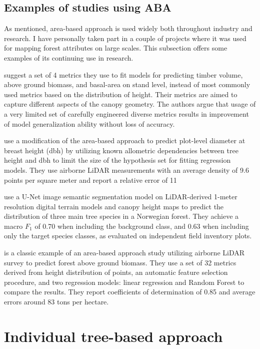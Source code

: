 \subsection{Examples of studies using ABA}

As mentioned, area-based approach is used widely both throughout industry and research.
I have personally taken part in a couple of projects where it was used for mapping forest attributes on large scales.
This subsection offers some examples of its continuing use in research.

\citet{bouvierGeneralizingPredictiveModels2015} suggest a set of 4 metrics they use to fit models for predicting timber volume, above ground biomass, and basal-area on stand level, instead of most commonly used metrics based on the distribution of height.
Their metrics are aimed to capture different aspects of the canopy geometry.
The authors argue that usage of a very limited set of carefully engineered diverse metrics results in improvement of model generalization ability without loss of accuracy.

\citet{zhangImprovedAreabasedApproach2023} use a modification of the area-based approach to predict plot-level diameter at breast height (dbh) by utilizing known allometric dependencies between tree height and dbh to limit the size of the hypothesis set for fitting regression models.
They use airborne LiDAR measurements with an average density of 9.6 points per square meter and report a relative error of 11%

\citet{vermeerLidarbasedNorwegianTree2023} use a U-Net \citep{ronnebergerUNetConvolutionalNetworks2015} image semantic segmentation model on LiDAR-derived 1-meter resolution digital terrain models and canopy height maps to predict the distribution of three main tree species in a Norwegian forest.
They achieve a macro $F_1$ of 0.70 when including the background class, and 0.63 when including only the target species classes, as evaluated on independent field inventory plots.

\citet{kcEstimationAboveGroundForest2024} is a classic example of an area-based approach study utilizing airborne LiDAR survey to predict forest above ground biomass.
They use a set of 32 metrics derived from height distribution of points, an automatic feature selection procedure, and two regression models: linear regression and Random Forest to compare the results.
They report coefficients of determination of 0.85 and average errors around 83 tons per hectare.


\section{Individual tree-based approach}\label{sec-individual-tree-approach}

